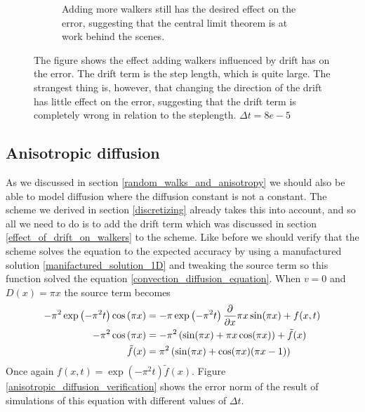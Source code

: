 \begin{figure}[H]
\begin{subfigure}[b]{0.48\textwidth}
\caption{Adding more walkers still has the desired effect on the error, suggesting that the central limit theorem is at work behind the scenes.}
\label{Errortest_convection_diffusion_walkers:more_walkers}
\end{subfigure}
\caption[Adding walkers influenced by drift]{The figure shows the effect adding walkers influenced by drift has on the error. 
The drift term is the step length, which is quite large. The strangest thing is, however, that changing the direction of the drift has little effect on the error, suggesting that the drift term is completely wrong in relation to the steplength. $\Delta t =8e-5$}
\label{Errortest_convection_diffusion_walkers}
\end{figure}



\subsection{Anisotropic diffusion}

As we discussed in section \ref{random_walks_and_anisotropy} we should also be able to model diffusion where the diffusion constant is not a constant. 
The scheme we derived in section \ref{discretizing} already takes this into account, and so all we need to do is to add the drift term which was discussed in section \ref{effect_of_drift_on_walkers} to the scheme. 
Like before we should verify that the scheme solves the equation to the expected accuracy by using a manufactured solution \ref{manifactured_solution_1D} and tweaking the source term so this function solved the equation \ref{convection_diffusion_equation}. 
When $v=0$ and $D(x) = \pi x$ the source term becomes
\begin{align*}
 -\pi^2\exp\left(-\pi^2t\right)\cos\left(\pi x\right) &= -\pi\exp\left(-\pi^2t\right)\frac{\partial}{\partial x}\pi x\sin(\pi x) +f(x,t) \\
 -\pi^2\cos\left(\pi x\right) &= -\pi^2\left(\sin(\pi x) + \pi x\cos(\pi x)\right) +\tilde{f}(x) \\
 \tilde{f}(x) &= \pi^2\left(\sin(\pi x) +\cos(\pi x)(\pi x-1)\right)
\end{align*}
Once again $f(x,t) = \exp\left(-\pi^2t\right)\tilde{f}(x)$. Figure \ref{anisotropic_diffusion_verification} shows the error norm of the result of simulations of this equation with different values of $\Delta t$.

